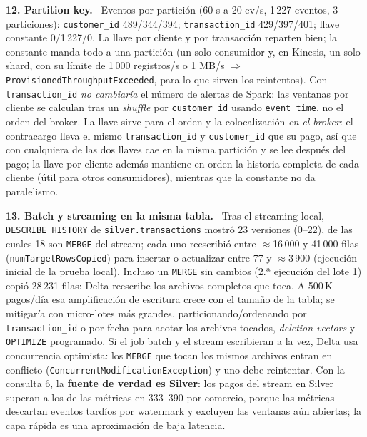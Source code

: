 \documentclass[10pt,a4paper]{article}
\newcommand{\q}[1]{\par\smallskip\textbf{#1}\ }
\newcommand{\code}[1]{\texttt{\small #1}}
\begin{document}
\q{12. Partition key.} Eventos por partición (60 s a 20 ev/s, 1\,227 eventos, 3 particiones): \code{customer\_id} 489/344/394; \code{transaction\_id} 429/397/401; llave constante 0/1\,227/0. La llave por cliente y por transacción reparten bien; la constante manda todo a una partición (un solo consumidor y, en Kinesis, un solo shard, con su límite de 1\,000 registros/s o 1 MB/s $\Rightarrow$ \code{ProvisionedThroughputExceeded}, para lo que sirven los reintentos). Con \code{transaction\_id} \emph{no cambiaría} el número de alertas de Spark: las ventanas por cliente se calculan tras un \emph{shuffle} por \code{customer\_id} usando \code{event\_time}, no el orden del broker. La llave sirve para el orden y la colocalización \emph{en el broker}: el contracargo lleva el mismo \code{transaction\_id} y \code{customer\_id} que su pago, así que con cualquiera de las dos llaves cae en la misma partición y se lee después del pago; la llave por cliente además mantiene en orden la historia completa de cada cliente (útil para otros consumidores), mientras que la constante no da paralelismo.

\q{13. Batch y streaming en la misma tabla.} Tras el streaming local, \code{DESCRIBE HISTORY} de \code{silver.transactions} mostró 23 versiones (0--22), de las cuales 18 son \code{MERGE} del stream; cada uno reescribió entre $\approx$16\,000 y 41\,000 filas (\code{numTargetRowsCopied}) para insertar o actualizar entre 77 y $\approx$3\,900 (ejecución inicial de la prueba local). Incluso un \code{MERGE} sin cambios (2.ª ejecución del lote 1) copió 28\,231 filas: Delta reescribe los archivos completos que toca. A 500\,K pagos/día esa amplificación de escritura crece con el tamaño de la tabla; se mitigaría con micro-lotes más grandes, particionando/ordenando por \code{transaction\_id} o por fecha para acotar los archivos tocados, \emph{deletion vectors} y \code{OPTIMIZE} programado. Si el job batch y el stream escribieran a la vez, Delta usa concurrencia optimista: los \code{MERGE} que tocan los mismos archivos entran en conflicto (\code{ConcurrentModificationException}) y uno debe reintentar. Con la consulta 6, la \textbf{fuente de verdad es Silver}: los pagos del stream en Silver superan a los de las métricas en 333--390 por comercio, porque las métricas descartan eventos tardíos por watermark y excluyen las ventanas aún abiertas; la capa rápida es una aproximación de baja latencia.
\end{document}
